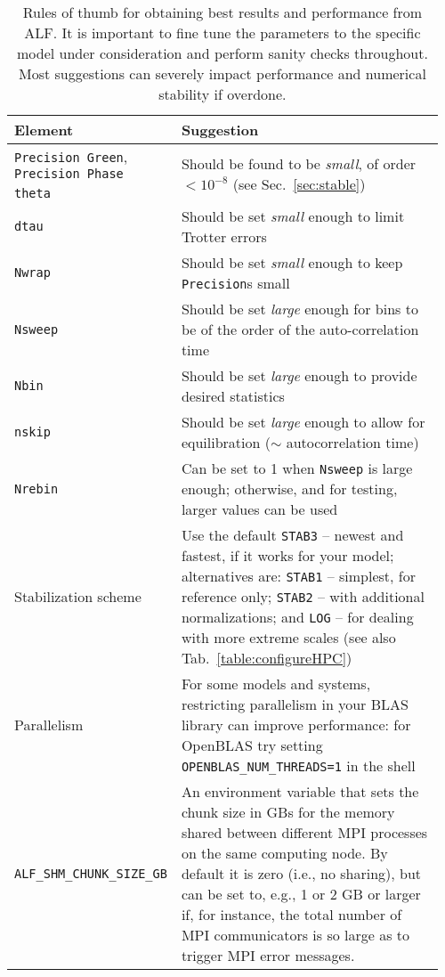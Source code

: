 \begin{table}[h!]
	\begin{center}
		\begin{tabular}{@{} p{0.22\linewidth} p{0.74\linewidth} @{}}\toprule
			Element & Suggestion  \\ \midrule
			\texttt{Precision Green}, \texttt{Precision Phase}  &  \multirow{2}{*}{Should be found to be \emph{small}, of order $< 10^{-8}$ (see Sec.~\ref{sec:stable})}\\
			\texttt{theta}       & Should be \emph{large} enough to guarantee convergence to ground state \\
			\texttt{dtau}        & Should be set \emph{small} enough to limit Trotter errors\\
			\texttt{Nwrap}       & Should be set \emph{small} enough to keep \texttt{Precision}s small\\
			\texttt{Nsweep}      & Should be set \emph{large} enough for bins to be of the order of the auto-correlation time\\
			\texttt{Nbin}        & Should be set \emph{large} enough to provide desired statistics \\
			\texttt{nskip}       & Should be set \emph{large} enough to allow for equilibration ($\sim$ autocorrelation time) \\
			\texttt{Nrebin}      & Can be set to 1 when \texttt{Nsweep} is large enough; otherwise, and for testing, larger values can be used\\
			Stabilization scheme & Use the default \texttt{STAB3} -- newest and fastest, if it works for your model; alternatives are: \texttt{STAB1} -- simplest, for reference only; \texttt{STAB2} -- with additional normalizations; and \texttt{LOG} -- for dealing with more extreme scales (see also Tab.~\ref{table:configureHPC}) \\
			Parallelism          & For some models and systems, restricting parallelism in your BLAS library can improve performance: for OpenBLAS try setting \texttt{OPENBLAS\_NUM\_THREADS=1} in the shell \\
			\texttt{ALF\_SHM\_CHUNK\_SIZE\_GB} & An environment variable that sets the chunk size in GBs for the memory shared between different MPI processes on the same computing node. By default it is zero (i.e., no sharing), but can be set to, e.g., 1 or 2 GB or larger if, for instance, the total number of MPI communicators is so large as to trigger MPI error messages. \\\bottomrule
		\end{tabular}
		\caption{Rules of thumb for obtaining best results and performance from ALF. It is important to fine tune the parameters to the specific model under consideration and perform sanity checks throughout. Most suggestions can severely impact performance and numerical stability if overdone. \label{table:tips}}
	\end{center}
\end{table}


